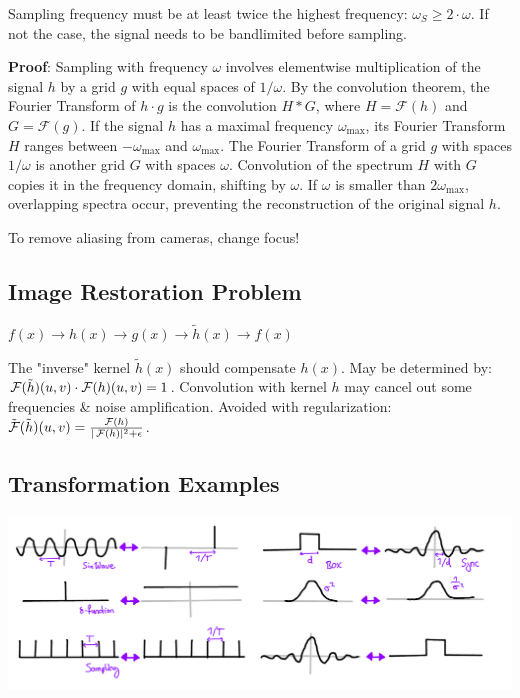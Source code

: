 \begin{algorithm}
  Sampling frequency must be at least twice the highest frequency: \(\omega_S \geq 2 \cdot \omega\). If not the case, the signal needs to be bandlimited before sampling.
\end{algorithm}

\textbf{Proof}:
Sampling with frequency \(\omega\) involves elementwise multiplication of the signal \(h\) by a grid \(g\) with equal spaces of \(1/\omega\).
By the convolution theorem, the Fourier Transform of \(h \cdot g\) is the convolution \(H * G\), where \(H = \mathcal{F}(h)\) and \(G = \mathcal{F}(g)\).
If the signal \(h\) has a maximal frequency \(\omega_{\text{max}}\), its Fourier Transform \(H\) ranges between \(-\omega_{\text{max}}\) and \(\omega_{\text{max}}\).
The Fourier Transform of a grid \(g\) with spaces \(1/\omega\) is another grid \(G\) with spaces \(\omega\).
Convolution of the spectrum \(H\) with \(G\) copies it in the frequency domain, shifting by \(\omega\).
If \(\omega\) is smaller than \(2\omega_{\text{max}}\), overlapping spectra occur, preventing the reconstruction of the original signal \(h\).

\begin{theorem}
  To remove aliasing from cameras, change focus!
\end{theorem}

\subsection{Image Restoration Problem}
\begin{center}
  \(f(x) \to h(x) \to g(x) \to \tilde{h}(x) \to f(x)\)
\end{center}
The "inverse" kernel \(\tilde{h}(x)\) should compensate \(h(x)\). May be determined by: \(\operatorname{\mathcal{F}}(\tilde{h})(u, v) \cdot \operatorname{\mathcal{F}}(h)(u, v) = 1\). Convolution with kernel \(h\) may cancel out some frequencies \& noise amplification. Avoided with regularization: \(\tilde{\operatorname{\mathcal{F}}}(\tilde{h})(u, v) = \frac{\operatorname{\mathcal{F}}(h)}{|\operatorname{\mathcal{F}}(h)|^2 + \epsilon}\).

\subsection{Transformation Examples}
\includegraphics*[width=\linewidth]{assets/fourier-functions.png}
